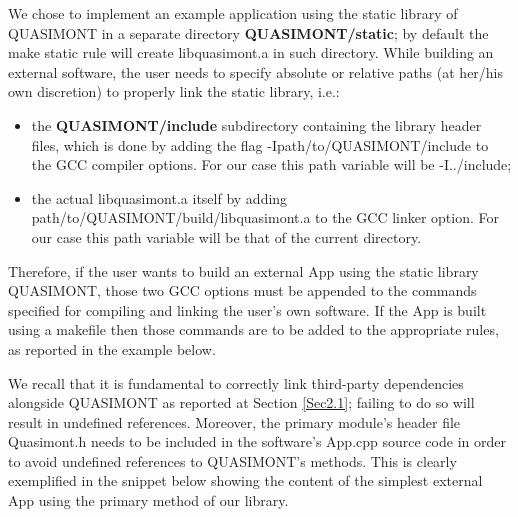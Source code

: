 \documentclass[a4paper, twosided]{book}
\begin{document}
\noindent
We chose to implement an example application using the static library of QUASIMONT in a separate directory \colorbox{poliGrayBlue}{\textbf{QUASIMONT/static}}; by default the \colorbox{poliGrayBlue}{make static} rule will create \colorbox{poliGrayBlue}{libquasimont.a} in such directory. While building an external software, the user needs to specify absolute or relative paths (at her/his own discretion) to properly link the static library, i.e.:
\begin{itemize}
    \item the \colorbox{poliGrayBlue}{\textbf{QUASIMONT/include}} subdirectory containing the library header files, which is done by adding the flag \colorbox{poliGrayBlue}{-Ipath/to/QUASIMONT/include} to the GCC compiler options. For our case this path variable will be \colorbox{poliGrayBlue}{-I../include};
    \item the actual \colorbox{poliGrayBlue}{libquasimont.a} itself by adding \colorbox{poliGrayBlue}{path/to/QUASIMONT/build/libquasimont.a} to the GCC linker option. For our case this path variable will be that of the current directory.
\end{itemize}

\noindent
Therefore, if the user wants to build an external \colorbox{poliGrayBlue}{App} using the static library QUASIMONT, those two GCC options must be appended to the commands specified for compiling and linking the user's own software. If the \colorbox{poliGrayBlue}{App} is built using a \colorbox{poliGrayBlue}{makefile} then those commands are to be added to the appropriate rules, as reported in the example below. 

\vspace{0.25cm}
\vspace{0.25cm}

\noindent
We recall that it is fundamental to correctly link third-party dependencies alongside QUASIMONT as reported at Section \ref{Sec2.1}; failing to do so will result in undefined references. Moreover, the primary module's header file \colorbox{poliGrayBlue}{Quasimont.h} needs to be included in the software's \colorbox{poliGrayBlue}{App.cpp} source code in order to avoid undefined references to QUASIMONT's methods. This is clearly exemplified in the snippet below showing the content of the simplest external \colorbox{poliGrayBlue}{App} using the primary method of our library. 
\end{document}
